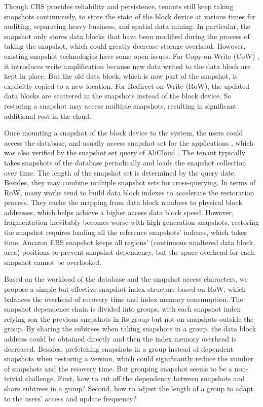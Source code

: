 \documentclass[sigconf, nonacm]{acmart}
\begin{document}
Though CBS provides reliability and persistence, tenants still keep taking snapshots continuously, to store the state of the block device at various times for auditing, separating heavy business, and spatial data mining. In particular, the snapshot only stores data blocks that have been modified during the process of taking the snapshot, which could greatly decrease storage overhead. However, existing snapshot technologies have some open issues. For Copy-on-Write (CoW) \cite{nightingale2008rethink,chidambaram2013optimistic}, it introduces write amplification because new data writed to the data block are kept in place. But the old data block, which is now part of the snapshot, is explicitly copied to a new location. For Redirect-on-Write (RoW), the updated data blocks are scattered in the snapshots instead of the block device. So restoring a snapshot may access multiple snapshots, resulting in significant additional cost in the cloud.

Once mounting a snapshot of the block device to the system, the users could access the database, and usually access snapshot set for the applications \cite{yang2011st,joseph2019securing,pekerskaya2006mining}, which was also verified by the snapshot set query of AliCloud \cite{alibackupset}. The tenant typically takes snapshots of the database periodically and loads the snapshot collection over time. The length of the snapshot set is determined by the query date. Besides, they may combine multiple snapshot sets for cross-querying.
In terms of RoW, many works tend to build data block indexes \cite{tsikoudis2020rid,tsikoudis2018rql,shrira2005snap} to accelerate the restoration process. They cache the mapping from data block numbers to physical block addresses, which helps achieve a higher access data block speed. However, fragmentation inevitably becomes worse with high generation snapshots, restoring the snapshot requires loading all the reference snapshots' indexes, which takes time. Amazon EBS snapshot \cite{AmazonEBSSnapshot} keeps all regions' (continuous unaltered data block area) positions to prevent snapshot dependency, but the space overhead for each snapshot cannot be overlooked.

Based on the workload of the database and the snapshot access characters, we propose a simple but effective snapshot index structure based on RoW, which balances the overhead of recovery time and index memory consumption. The snapshot dependence chain is divided into groups, with each snapshot index relying son the previous snapshots in its group but not on snapshots outside the group. 
By sharing the subtrees when taking snapshots in a group, the data block address could be obtained directly and then the index memory overhead is decreased. Besides, prefetching snapshots in a group instead of dependent snapshots when restoring a version, which could significantly reduce the number of snapshots and the recovery time. But grouping snapshot seems to be a non-trivial challenge. First, how to cut off the dependency between snapshots and share subtrees in a group? Second, how to adjust the length of a group to adapt to the users' access and update frequency?
\end{document}
